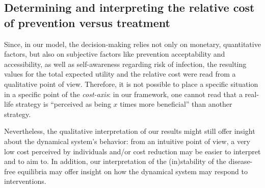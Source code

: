 

\subsection{Determining and interpreting the relative cost of prevention versus treatment}
Since, in our model, the decision-making relies not only on monetary, quantitative factors, but also on subjective factors like prevention acceptability and accessibility, as well as self-awareness regarding risk of infection, the resulting values for the total expected utility and the relative cost were read from a qualitative point of view. 
%
Therefore, it is not possible to place a specific situation in a specific point of the {\it cost-axis}: in our framework, one cannot read that a real-life strategy is ``perceived as being $x$ times more beneficial'' than another strategy. 

Nevertheless, the qualitative interpretation of our results might still offer insight about the dynamical system's behavior: from an intuitive point of view, a very low cost perceived by individuals and/or cost reduction may be easier to interpret and to aim to. In addition, our interpretation of the (in)stability of the disease-free equilibria may offer insight on how the dynamical system may respond to interventions. 


